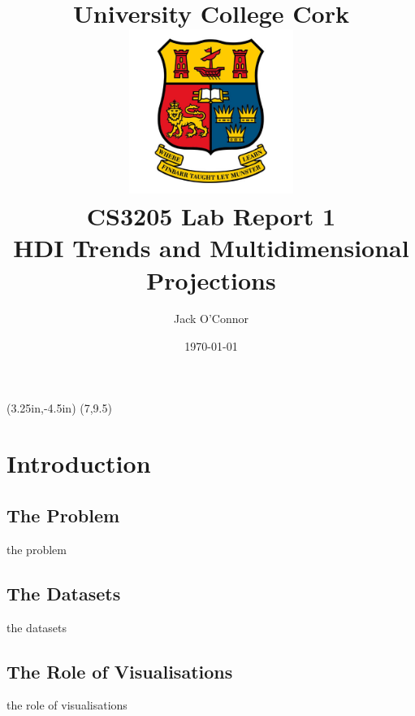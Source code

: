 \documentclass[11pt,a4paper,final]{article}
\title{ \vspace{3.5cm}
	University College Cork \\ [1cm]
	\includegraphics[width=0.4\textwidth]{ucc_crest} \\ [1cm]
	CS3205 Lab Report 1 \\ [0.5cm]
	HDI Trends and Multidimensional Projections
}
\author{Jack O'Connor}
\date{\today}
\begin{document}
\thisfancyput(3.25in,-4.5in){%
  \setlength{\unitlength}{1in}\fancyoval(7,9.5)}%
\maketitle
\pagebreak
{
\hypersetup{hidelinks}
\tableofcontents
}
\pagebreak
\setcounter{page}{1}


\section{Introduction}
\subsection{The Problem}
the problem

\subsection{The Datasets}
the datasets

\subsection{The Role of Visualisations}
the role of visualisations
\end{document}

